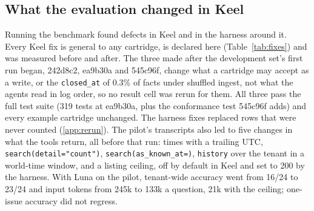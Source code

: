 \documentclass[sigconf, nonacm]{acmart}
\newcommand{\code}[1]{\texttt{#1}}
\begin{document}
\subsection{What the evaluation changed in Keel}
\label{app:changes}

Running the benchmark found defects in Keel and in the harness around it. Every Keel fix is general to any cartridge, is declared here (Table~\ref{tab:fixes}) and was measured before and after. The three made after the development set's first run began, 242d8c2, ea9b30a and 545c96f, change what a cartridge may accept as a write, or the \code{closed\_at} of 0.3\% of facts under shuffled ingest, not what the agents read in log order, so no result cell was rerun for them. All three pass the full test suite (319 tests at ea9b30a, plus the conformance test 545c96f adds) and every example cartridge unchanged. The harness fixes replaced rows that were never counted (\ref{app:rerun}). The pilot's transcripts also led to five changes in what the tools return, all before that run: times with a trailing UTC, \code{search(detail="count")}, \code{search(as\_known\_at=)}, \code{history} over the tenant in a world-time window, and a listing ceiling, off by default in Keel and set to 200 by the harness. With Luna on the pilot, tenant-wide accuracy went from 16/24 to 23/24 and input tokens from 245k to 133k a question, 21k with the ceiling; one-issue accuracy did not regress.
\end{document}
